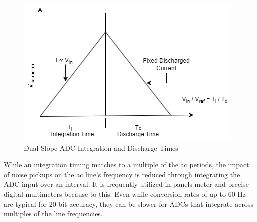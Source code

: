 \begin{figure}[htbp]
\centering
\includegraphics[scale=0.6]{images/Slope.png}
\caption{Dual-Slope ADC Integration and
Discharge Times}
\label{fig:x Dual Slope}
\end{figure}

While an integration timing matches to a multiple of the ac periods, the impact of noise pickups on the ac line's frequency is reduced through integrating the ADC input over an interval. It is frequently utilized in panels meter and precise digital multimeters because to this. Even while conversion rates of up to 60 Hz are typical for 20-bit accuracy, they can be slower for ADCs that integrate across multiples of the line frequencies.

